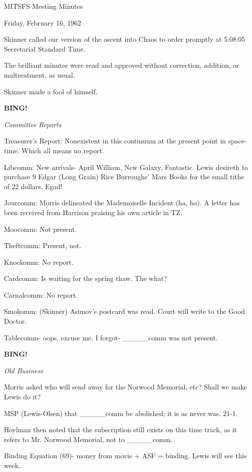 \documentclass[12pt]{article}
\newcommand{\bing}{{\bf BING!} }
\newcommand{\goto}[1]{\bing \vskip 12pt \centerline{{\em{#1}}}}
\begin{document}
\begin{center}

MITSFS Meeting Minutes

Friday, February 16, 1962

\end{center}
 
\vspace{12pt}

\setlength{\parskip}{6pt}

\noindent
Skinner called our version of the ascent into Chaos to order promptly at 5:08:05 Secretarial Standard Time.

The brilliant minutes were read and approved without correction, addition, or maltreatment, as usual.

Skinner made a fool of himself.

\goto{Committee Reports}

Treasurer's Report: Nonexistent in this continuum at the present point in space-time. Which all means no report.

Libcomm: New arrivals- April William, New Galaxy, Fantastic. Lewis desireth to purchase 9 Edgar (Long Grain) Rice Burroughs' Mars Books for the small tithe of 22 dollars. Egad!

Jourcomm: Morris delineated the Mademoiselle Incident (ha, ha). A letter has been received from Harrison praising his own article in TZ.

Moocomm: Not present.

Theftcomm: Present, not.

Knockomm: No report.

Cardcomm: Is waiting for the spring thaw. The what?

Carnalcomm: No report.

Smokomm: (Skinner) Asimov's postcard was read. Court will write to the Good Doctor.

Tablecomm- oops, excuse me, I forgot- _____comm was not present.

\goto{Old Business}

Morris asked who will send away for the Norwood Memorial, etc? Shall we make Lewis do it?

MSP (Lewis-Olsen) that _____comm be abolished; it is as never was. 21-1.

Hoylman then noted that the subscription still exists on this time track, as it refers to Mr. Norwood Memorial, not to _____comm.

Binding Equation (69)- money from movie + ASF = binding. Lewis will see this week.
\end{document}
